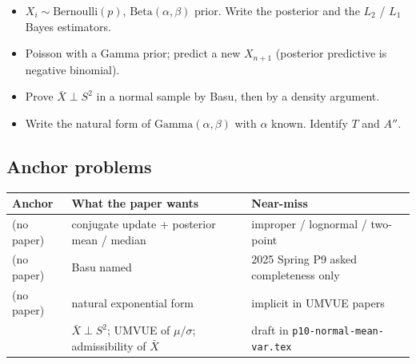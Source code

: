 \begin{itemize}
    \item \(X_{i}\sim\mathrm{Bernoulli}(p)\), \(\mathrm{Beta}(\alpha,\beta)\) prior. Write the posterior and the \(L_{2}\) / \(L_{1}\) Bayes estimators.
    \item Poisson with a Gamma prior; predict a new \(X_{n+1}\) (posterior predictive is negative binomial).
    \item Prove \(\bar X\perp S^{2}\) in a normal sample by Basu, then by a density argument.
    \item Write the natural form of \(\mathrm{Gamma}(\alpha,\beta)\) with \(\alpha\) known. Identify \(T\) and \(A''\).
\end{itemize}

\subsection{Anchor problems}

{\footnotesize
\begin{center}
\begin{tabular}{@{}L{2.7cm}L{5.4cm}L{6.1cm}@{}}
\toprule
Anchor & What the paper wants & Near-miss \\
\midrule
(no paper) & conjugate update + posterior mean / median & improper / lognormal / two-point \\
(no paper) & Basu named & 2025 Spring P9 asked completeness only \\
(no paper) & natural exponential form & implicit in UMVUE papers \\
 & \(\bar X\perp S^{2}\); UMVUE of \(\mu/\sigma\); admissibility of \(\bar X\) & draft in \texttt{p10-normal-mean-var.tex} \\
\bottomrule
\end{tabular}
\end{center}
}
